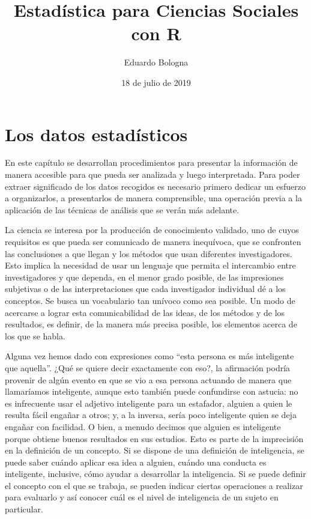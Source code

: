 \documentclass[]{book}
\title{Estadística para Ciencias Sociales con R}
\author{Eduardo Bologna}
\date{18 de julio de 2019}
\begin{document}
\maketitle

{
\hypersetup{linkcolor=black}
\setcounter{tocdepth}{1}
\tableofcontents
}
\listoftables
\listoffigures
\hypertarget{section}{%
\chapter*{}\label{section}}

\hypertarget{los-datos-estadisticos}{%
\chapter{Los datos estadísticos}\label{los-datos-estadisticos}}

En este capítulo se desarrollan procedimientos para presentar la información de manera accesible para que pueda ser analizada y luego interpretada. Para poder extraer significado de los datos recogidos es necesario primero dedicar un esfuerzo a organizarlos, a presentarlos de manera comprensible, una operación previa a la aplicación de las técnicas de análisis que se verán más adelante.

La ciencia se interesa por la producción de conocimiento validado, uno de cuyos requisitos es que pueda ser comunicado de manera inequívoca, que se confronten las conclusiones a que llegan y los métodos que usan diferentes investigadores. Esto implica la necesidad de usar un lenguaje que permita el intercambio entre investigadores y que dependa, en el menor grado posible, de las impresiones subjetivas o de las interpretaciones que cada investigador individual dé a los conceptos. Se busca un vocabulario tan unívoco como sea posible. Un modo de acercarse a lograr esta comunicabilidad de las ideas, de los métodos y de los resultados, es definir, de la manera más precisa posible, los elementos acerca de los que se habla.

Alguna vez hemos dado con expresiones como ``esta persona es más inteligente que aquella''. ¿Qué se quiere decir exactamente con eso?, la afirmación podría provenir de algún evento en que se vio a esa persona actuando de manera que llamaríamos inteligente, aunque esto también puede confundirse con astucia: no es infrecuente usar el adjetivo inteligente para un estafador, alguien a quien le resulta fácil engañar a otros; y, a la inversa, sería poco inteligente quien se deja engañar con facilidad. O bien, a menudo decimos que alguien es inteligente porque obtiene buenos resultados en sus estudios. Esto es parte de la imprecisión en la definición de un concepto. Si se dispone de una definición de inteligencia, se puede saber cuándo aplicar esa idea a alguien, cuándo una conducta es inteligente, inclusive, cómo ayudar a desarrollar la inteligencia. Si se puede definir el concepto con el que se trabaja, se pueden indicar ciertas operaciones a realizar para evaluarlo y así conocer cuál es el nivel de inteligencia de un sujeto en particular.
\end{document}
